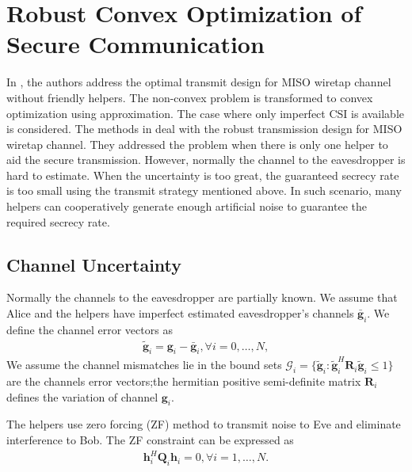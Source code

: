 \documentclass[journal]{IEEEtran}
\begin{document}
\section{Robust Convex Optimization of Secure Communication} \label{sec:robust programming}
In \cite{li_optimal_2011}, the authors address the optimal transmit design for MISO wiretap channel without friendly	 helpers. The non-convex problem is transformed to convex optimization using approximation. The case where only imperfect CSI is available is considered. The methods in \cite{Zhang_Cooperative2015,huang_cooperative_2011} deal with the robust transmission design for MISO wiretap channel. They addressed the problem when there is only one helper to aid the secure transmission. However, normally the channel to the eavesdropper is hard to estimate. When the uncertainty is too great, the guaranteed secrecy rate is too small using the transmit strategy mentioned above. In such scenario, many helpers can cooperatively generate enough artificial noise to guarantee the required secrecy rate.
\subsection{Channel Uncertainty} 
Normally the channels to the eavesdropper are partially known. We assume that  Alice and the helpers have imperfect estimated eavesdropper's channels $\bar{\mathbf{g}}_i$. We define the channel error vectors as
\begin{eqnarray}
\tilde{\mathbf{g}}_i = \mathbf{g}_i-\bar{\mathbf{g}}_i,\forall i = 0,\ldots, N,
\end{eqnarray}
We assume the channel mismatches lie in the bound sets $\mathcal{G}_i=\{\tilde{\mathbf{g}}_i: \tilde{\mathbf{g}}_i^H \mathbf{R}_i\tilde{\mathbf{g}}_i \leq 1\}$ are the channels error vectors;the hermitian positive semi-definite  matrix $\mathbf{R}_i $ defines the variation of channel $\mathbf{g}_i$. 

The helpers use zero forcing (ZF) method to transmit noise to Eve and eliminate interference to Bob.
The ZF constraint can be expressed as
\begin{eqnarray} \label{eq:ZF constraint}
\mathbf{h}_i^H\mathbf{Q}_i \mathbf{h}_i = 0, \forall i = 1,\ldots,N \label{eq:ZF_constraint_relaxed}.
\end{eqnarray}
\end{document}
